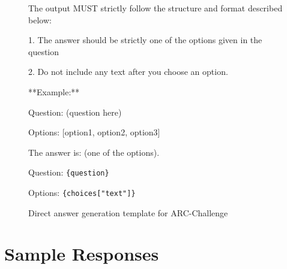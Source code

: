\begin{figure}[ht]
    \centering
    \begin{bluetextbox}
    The output MUST strictly follow the structure and format described below:

    1. The answer should be strictly one of the options given in the question
    
    2. Do not include any text after you choose an option.
    
    **Example:**
    
    Question: (question here)
    
    Options: [option1, option2, option3]

    The answer is: (one of the options).

    Question: \texttt{\{question\}}
    
    Options: \texttt{\{choices["text"]\}}
    \end{bluetextbox}
    \caption{Direct answer generation template for ARC-Challenge}
    \label{fig:template_arc_direct}
\end{figure}

\newpage
\section{Sample Responses}
\label{sec:sample}

